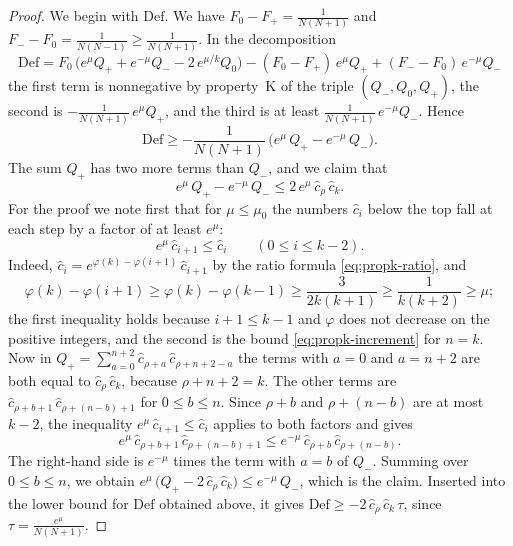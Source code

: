\documentclass{amsart}
\theoremstyle{definition}
\theoremstyle{remark}
\numberwithin{equation}{section}
\begin{document}
\begin{proof}
We begin with $\mathrm{Def}$. We have $F_0-F_+=\frac{1}{N(N+1)}$ and $F_--F_0=\frac{1}{N(N-1)}\ge\frac{1}{N(N+1)}$. In the decomposition
\[
\mathrm{Def}=F_0\,\bigl(e^{\mu}Q_++e^{-\mu}Q_--2\,e^{\mu/k}Q_0\bigr)-(F_0-F_+)\,e^{\mu}Q_++(F_--F_0)\,e^{-\mu}Q_-
\]
the first term is nonnegative by property~K of the triple $(Q_-,Q_0,Q_+)$, the second is $-\frac{1}{N(N+1)}\,e^{\mu}Q_+$, and the third is at least $\frac{1}{N(N+1)}\,e^{-\mu}Q_-$. Hence
\[
\mathrm{Def}\ge-\frac{1}{N(N+1)}\,\bigl(e^{\mu}\,Q_+-e^{-\mu}\,Q_-\bigr).
\]
The sum $Q_+$ has two more terms than $Q_-$, and we claim that
\[
e^{\mu}\,Q_+-e^{-\mu}\,Q_-\le 2\,e^{\mu}\,\hat c_\rho\,\hat c_k.
\]
For the proof we note first that for $\mu\le\mu_0$ the numbers $\hat c_i$ below the top fall at each step by a factor of at least $e^{\mu}$:
\[
e^{\mu}\,\hat c_{i+1}\le\hat c_i\qquad(0\le i\le k-2).
\]
Indeed, $\hat c_i=e^{\varphi(k)-\varphi(i+1)}\,\hat c_{i+1}$ by the ratio formula \eqref{eq:propk-ratio}, and
\[
\varphi(k)-\varphi(i+1)\ge\varphi(k)-\varphi(k-1)\ge\frac{3}{2k(k+1)}\ge\frac{1}{k(k+2)}\ge\mu;
\]
the first inequality holds because $i+1\le k-1$ and $\varphi$ does not decrease on the positive integers, and the second is the bound \eqref{eq:propk-increment} for $n=k$. Now in $Q_+=\sum_{a=0}^{n+2}\hat c_{\rho+a}\,\hat c_{\rho+n+2-a}$ the terms with $a=0$ and $a=n+2$ are both equal to $\hat c_\rho\,\hat c_k$, because $\rho+n+2=k$. The other terms are $\hat c_{\rho+b+1}\,\hat c_{\rho+(n-b)+1}$ for $0\le b\le n$. Since $\rho+b$ and $\rho+(n-b)$ are at most $k-2$, the inequality $e^{\mu}\,\hat c_{i+1}\le\hat c_i$ applies to both factors and gives
\[
e^{\mu}\,\hat c_{\rho+b+1}\,\hat c_{\rho+(n-b)+1}\le e^{-\mu}\,\hat c_{\rho+b}\,\hat c_{\rho+(n-b)}.
\]
The right-hand side is $e^{-\mu}$ times the term with $a=b$ of $Q_-$. Summing over $0\le b\le n$, we obtain $e^{\mu}\,\bigl(Q_+-2\,\hat c_\rho\,\hat c_k\bigr)\le e^{-\mu}\,Q_-$, which is the claim. Inserted into the lower bound for $\mathrm{Def}$ obtained above, it gives $\mathrm{Def}\ge-2\,\hat c_\rho\,\hat c_k\,\tau$, since $\tau=\frac{e^{\mu}}{N(N+1)}$.


\end{proof}
\end{document}

